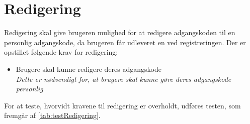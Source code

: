 \section{Redigering}
Redigering skal give brugeren mulighed for at redigere adgangskoden til en personlig adgangskode, da brugeren får udleveret en ved registreringen. Der er opstillet følgende krav for redigering:

\begin{itemize}
\item Brugere skal kunne redigere deres adgangskode
\\
\textit{Dette er nødvendigt for, at brugere skal kunne gøre deres adgangskode personlig}
\end{itemize}

\noindent
For at teste, hvorvidt kravene til redigering er overholdt, udføres testen, som fremgår af \autoref{tab:testRedigering}.

